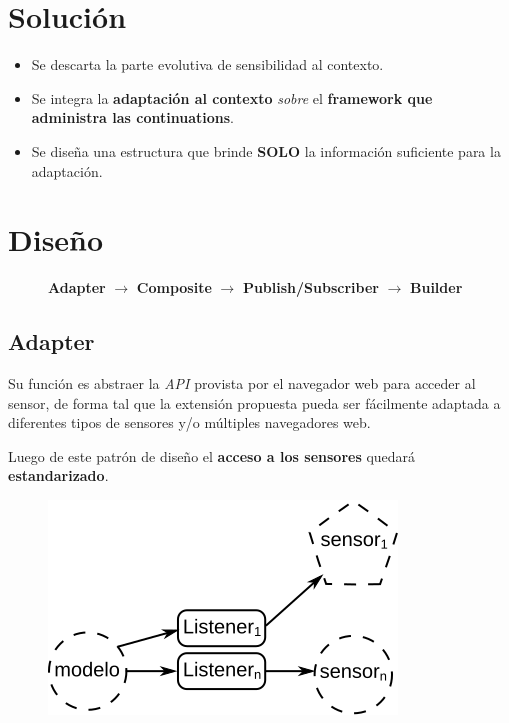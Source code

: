 \documentclass[
paper=128mm:96mm, %
fontsize=11pt, %
pagesize, %
parskip=half-, %
]{scrartcl} %
\theoremstyle{mythmstyle} %
\begin{document}
\clearpage

\section{Solución}

\begin{itemize}
	\item Se descarta la parte evolutiva de sensibilidad al contexto.
	\item Se integra la \textbf{adaptación al contexto} \textit{sobre} el \textbf{framework que administra las continuations}.
	\item Se diseña una estructura que brinde \textbf{SOLO} la información suficiente para la adaptación.
\end{itemize}

\clearpage


\section{Diseño}

\begin{figure}[ht!]
\centering
\textbf{Adapter}\cite{Gamma95} $\rightarrow$ \textbf{Composite}\cite{Gamma95} $\rightarrow$ \textbf{Publish/Subscriber}\cite{Gamma95} $\rightarrow$ \textbf{Builder}\cite{Gamma95}
\end{figure}

\clearpage

\subsection{Adapter}

Su función es abstraer la \emph{API} provista por el navegador web para acceder al sensor, de forma tal que la extensión propuesta pueda ser fácilmente adaptada a diferentes tipos de sensores y/o múltiples navegadores web.

Luego de este patrón de diseño el \textbf{acceso a los sensores} quedará \textbf{estandarizado}.

\begin{figure}[ht!]
\centering\includegraphics[width=0.4\linewidth]{Figures/DesignPatternAdapter}
\end{figure}
\end{document}
